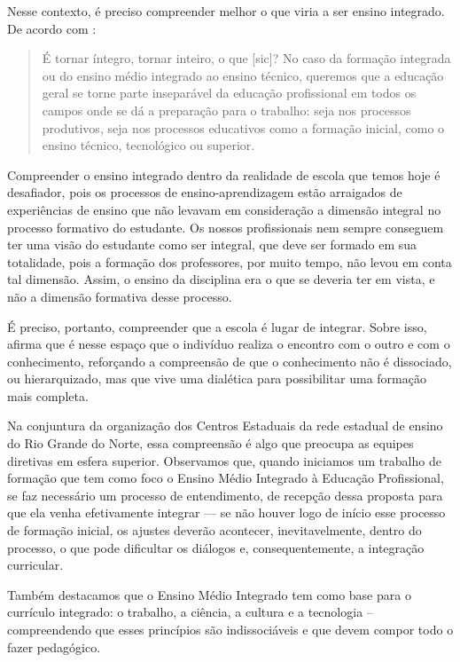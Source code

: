 \begin{refsection}
    Nesse contexto, é preciso compreender melhor o que viria a ser ensino integrado. De acordo com \textcite[p.~2]{CIAVATTA2005formação}: 

    \begin{quotation}
        É tornar íntegro, tornar inteiro, o que [sic]? No caso da formação integrada ou do ensino médio integrado ao ensino técnico, queremos que a educação geral se torne parte inseparável da educação profissional em todos os campos onde se dá a preparação para o trabalho: seja nos processos produtivos, seja nos processos educativos como a formação inicial, como o ensino técnico, tecnológico ou superior. 
    \end{quotation}


    Compreender o ensino integrado dentro da realidade de escola que temos hoje é desafiador, pois os processos de ensino-aprendizagem estão arraigados de experiências de ensino que não levavam em consideração a dimensão integral no processo formativo do estudante. Os nossos profissionais nem sempre conseguem ter uma visão do estudante como ser integral, que deve ser formado em sua totalidade, pois a formação dos professores, por muito tempo, não levou em conta tal dimensão. Assim, o ensino da disciplina era o que se deveria ter em vista, e não a dimensão formativa desse processo.  

    É preciso, portanto, compreender que a escola é lugar de integrar. Sobre isso, \textcite[p.~43]{MACHADO2013avaliação} afirma que é nesse espaço que o indivíduo realiza o encontro com o outro e com o conhecimento, reforçando a compreensão de que o conhecimento não é dissociado, ou hierarquizado, mas que vive uma dialética para possibilitar uma formação mais completa.  

    Na conjuntura da organização dos Centros Estaduais da rede estadual de ensino do Rio Grande do Norte, essa compreensão é algo que preocupa as equipes diretivas em esfera superior. Observamos que, quando iniciamos um trabalho de formação que tem como foco o Ensino Médio Integrado à Educação Profissional, se faz necessário um processo de entendimento, de recepção dessa proposta para que ela venha efetivamente integrar --- se não houver logo de início esse processo de formação inicial, os ajustes deverão acontecer, inevitavelmente, dentro do processo, o que pode dificultar os diálogos e, consequentemente, a integração curricular.  

    Também destacamos que o Ensino Médio Integrado tem como base para o currículo integrado: o trabalho, a ciência, a cultura e a tecnologia – compreendendo que esses princípios são indissociáveis \cite{RAMOS2008Concepção} e que devem compor todo o fazer pedagógico.  


\end{refsection}
